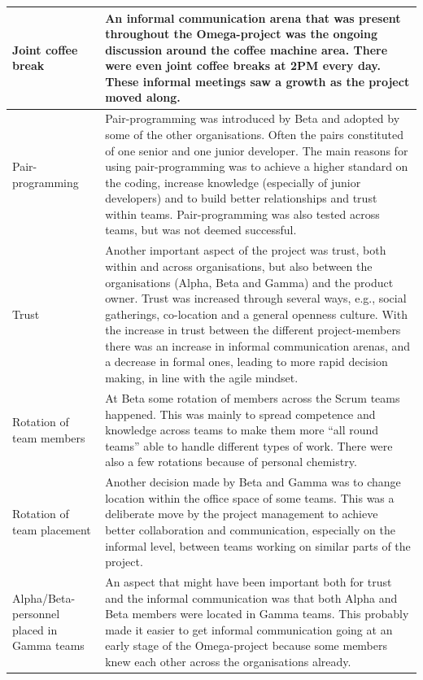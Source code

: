 \begin{center}
\begin{longtable}{| p{6cm} | p{9cm} |}
    Joint coffee break & An informal communication arena that was present throughout the Omega-project was the ongoing discussion around the coffee machine area. There were even joint coffee breaks at 2PM every day. These informal meetings saw a growth as the project moved along. \\ \hline
    Pair-programming & Pair-programming was introduced by Beta and adopted by some of the other organisations. Often the pairs constituted of one senior and one junior developer. The main reasons for using pair-programming was to achieve a higher standard on the coding, increase knowledge (especially of junior developers) and to build better relationships and trust within teams. Pair-programming was also tested across teams, but was not deemed successful. \\ \hline
    Trust & Another important aspect of the project was trust, both within and across organisations, but also between the organisations (Alpha, Beta and Gamma) and the product owner. Trust was increased through several ways, e.g., social gatherings, co-location and a general openness culture. With the increase in trust between the different project-members there was an increase in informal communication arenas, and a decrease in formal ones, leading to more rapid decision making, in line with the agile mindset. \\ \hline
    Rotation of team members & At Beta some rotation of members across the Scrum teams happened. This was mainly to spread competence and knowledge across teams to make them more ``all round teams'' able to handle different types of work. There were also a few rotations because of personal chemistry. \\ \hline
    Rotation of team placement & Another decision made by Beta and Gamma was to change location within the office space of some teams. This was a deliberate move by the project management to achieve better collaboration and communication, especially on the informal level, between teams working on similar parts of the project. \\ \hline
    Alpha/Beta-personnel placed in Gamma teams & An aspect that might have been important both for trust and the informal communication was that both Alpha and Beta members were located in Gamma teams. This probably made it easier to get informal communication going at an early stage of the Omega-project because some members knew each other across the organisations already. \\ \hline

\end{longtable}
\end{center}
